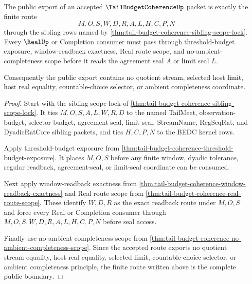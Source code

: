 \begin{theorem}
\label{thm:tail-budget-coherence-public-export-boundary}
The public export of an accepted $\TailBudgetCoherenceUp$ packet is exactly the finite route
$$
M,O,S,W,D,R,A,L,H,C,P,N
$$
through the sibling rows named by \autoref{thm:tail-budget-coherence-sibling-scope-lock}. Every $\RealUp$ or Completion consumer must pass through threshold-budget exposure, window-readback exactness, Real route scope, and no-ambient-completeness scope before it reads the agreement seal $A$ or limit seal $L$.

Consequently the public export contains no quotient stream, selected host limit, host real equality, countable-choice selector, or ambient completeness coordinate.
\end{theorem}
\begin{proof}
Start with the sibling-scope lock of \autoref{thm:tail-budget-coherence-sibling-scope-lock}. It ties $M,O,S,A,L,W,R,D$ to the named TailMeet, observation-budget, selector-budget, agreement-seal, limit-seal, StreamName, RegSeqRat, and DyadicRatCore sibling packets, and ties $H,C,P,N$ to the BEDC kernel rows.

Apply threshold-budget exposure from \autoref{thm:tail-budget-coherence-threshold-budget-exposure}. It places $M,O,S$ before any finite window, dyadic tolerance, regular readback, agreement-seal, or limit-seal coordinate can be consumed.

Next apply window-readback exactness from \autoref{thm:tail-budget-coherence-window-readback-exactness} and Real route scope from \autoref{thm:tail-budget-coherence-real-route-scope}. These identify $W,D,R$ as the exact readback route under $M,O,S$ and force every Real or Completion consumer through $M,O,S,W,D,R,A,L,H,C,P,N$ before seal access.

Finally use no-ambient-completeness scope from \autoref{thm:tail-budget-coherence-no-ambient-completeness-scope}. Since the accepted route exports no quotient stream equality, host real equality, selected limit, countable-choice selector, or ambient completeness principle, the finite route written above is the complete public boundary.
\end{proof}

